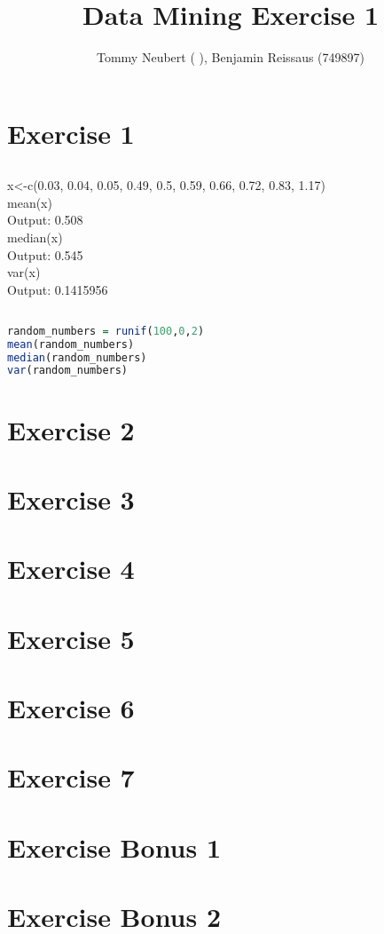 \documentclass[11pt, oneside]{article}   	%
\title{Data Mining Exercise 1}
\author{Tommy Neubert (  ), Benjamin Reissaus (749897)}
\begin{document}
\maketitle

\section{Exercise 1}
\subsection{}
x<-c(0.03, 0.04, 0.05, 0.49, 0.5, 0.59, 0.66, 0.72, 0.83, 1.17)\\

mean(x)\\
Output: 0.508\\
median(x)\\
Output: 0.545\\
var(x)\\
Output: 0.1415956\\

\subsection{}
\begin{lstlisting}[language=R] 
random_numbers = runif(100,0,2)
mean(random_numbers) 
median(random_numbers) 
var(random_numbers) 
\end{lstlisting}


\subsection{}


\section{Exercise 2}
\section{Exercise 3}
\section{Exercise 4}
\section{Exercise 5}
\section{Exercise 6}
\section{Exercise 7}
\section{Exercise Bonus 1}
\section{Exercise Bonus 2}
\end{document}
